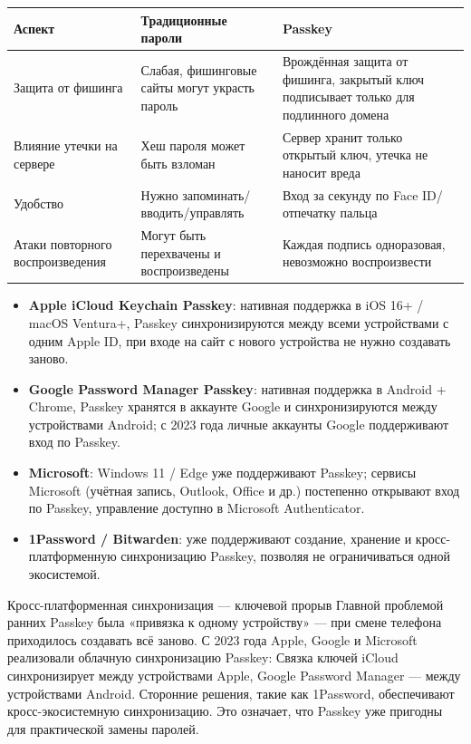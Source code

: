 \begin{center}
\begin{tabularx}{\linewidth}{|X|X|X|}
\hline
\textbf{Аспект} & \textbf{Традиционные пароли} & \textbf{Passkey} \tabularnewline
\hline
Защита от фишинга & Слабая, фишинговые сайты могут украсть пароль & Врождённая защита от фишинга, закрытый ключ подписывает только для подлинного домена \tabularnewline
Влияние утечки на сервере & Хеш пароля может быть взломан & Сервер хранит только открытый ключ, утечка не наносит вреда \tabularnewline
Удобство & Нужно запоминать/вводить/управлять & Вход за секунду по Face ID/отпечатку пальца \tabularnewline
Атаки повторного воспроизведения & Могут быть перехвачены и воспроизведены & Каждая подпись одноразовая, невозможно воспроизвести \tabularnewline
\hline
\end{tabularx}
\end{center}


\begin{itemize}
  \item \textbf{Apple iCloud Keychain Passkey}: нативная поддержка в iOS 16+ / macOS Ventura+, Passkey синхронизируются между всеми устройствами с одним Apple ID, при входе на сайт с нового устройства не нужно создавать заново.
  \item \textbf{Google Password Manager Passkey}: нативная поддержка в Android + Chrome, Passkey хранятся в аккаунте Google и синхронизируются между устройствами Android; с 2023 года личные аккаунты Google поддерживают вход по Passkey.
  \item \textbf{Microsoft}: Windows 11 / Edge уже поддерживают Passkey; сервисы Microsoft (учётная запись, Outlook, Office и др.) постепенно открывают вход по Passkey, управление доступно в Microsoft Authenticator.
  \item \textbf{1Password / Bitwarden}: уже поддерживают создание, хранение и кросс-платформенную синхронизацию Passkey, позволяя не ограничиваться одной экосистемой.
\end{itemize}

\begin{tcbinfo}{Кросс-платформенная синхронизация — ключевой прорыв}
Главной проблемой ранних Passkey была «привязка к одному устройству» — при смене телефона приходилось создавать всё заново. С 2023 года Apple, Google и Microsoft реализовали облачную синхронизацию Passkey: Связка ключей iCloud синхронизирует между устройствами Apple, Google Password Manager — между устройствами Android. Сторонние решения, такие как 1Password, обеспечивают кросс-экосистемную синхронизацию. Это означает, что Passkey уже пригодны для практической замены паролей.

\end{tcbinfo}

